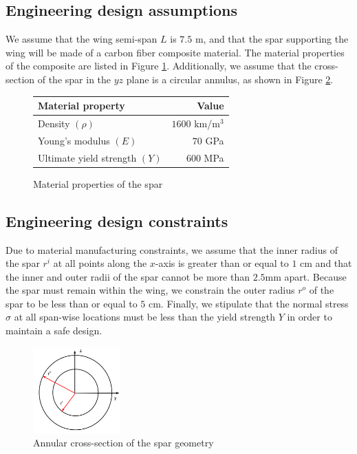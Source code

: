 \documentclass[11pt]{article}
\begin{document}
\subsection{Engineering design assumptions}

We assume that the wing semi-span $L$ is $7.5$ m,
and that the spar supporting the wing will be made
of a carbon fiber composite material. The material properties
of the composite are listed in Figure \ref{fig:materials}.
Additionally, we assume that the cross-section of
the spar in the $yz$ plane is a circular annulus,
as shown in Figure \ref{fig:annulus}.

\begin{figure}[hbt]
\centering
\begin{tabular}{ | l | r  |}
\hline
Material property & Value \\ \hline
Density $(\rho)$ & $1600$ km/m$^3$ \\ \hline
Young's modulus $(E)$ & $70$ GPa \\ \hline
Ultimate yield strength $(Y)$ & $600$ MPa \\ \hline
\end{tabular}
\caption{Material properties of the spar}
\label{fig:materials}
\end{figure}

\subsection{Engineering design constraints}

Due to material manufacturing constraints, we
assume that the inner radius of the spar $r^i$ at all
points along the $x$-axis is greater than or equal to $1$ cm
and that the inner and outer radii of the spar cannot be
more than $2.5$mm apart.
Because the spar must remain within the wing, we
constrain the outer radius $r^o$ of the spar to be less
than or equal to $5$ cm.
Finally, we stipulate that the normal stress $\sigma$ at all
span-wise locations must be less than the yield
strength $Y$ in order to maintain a safe design.

\begin{figure}[hbt]
\centering
\includegraphics[width=0.3\textwidth]{annulus}
\caption{Annular cross-section of the spar geometry}
\label{fig:annulus}
\end{figure}
\end{document}
